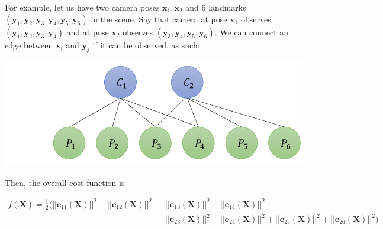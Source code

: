 \documentclass{article}
\theoremstyle{definition}
\theoremstyle{remark}
\theoremstyle{definition}
\begin{document}
For example, let us have two camera poses $\mathbf{x}_1, \mathbf{x}_2$ and 6 landmarks $(\mathbf{y}_1, \mathbf{y}_2, \mathbf{y}_3, \mathbf{y}_4, \mathbf{y}_5, \mathbf{y}_6)$ in the scene. Say that camera at pose $\mathbf{x}_1$ observes $(\mathbf{y}_1, \mathbf{y}_2, \mathbf{y}_3, \mathbf{y}_4)$ and at pose $\mathbf{x}_2$ observes $(\mathbf{y}_3, \mathbf{y}_4, \mathbf{y}_5, \mathbf{y}_6)$. We can connect an edge between $\mathbf{x}_i$ and $\mathbf{y}_j$ if it can be observed, as such: 

\begin{center}
  \includegraphics[scale=0.32]{img/node_graph.png}
\end{center}

Then, the overall cost function is  

\begin{align*}
  f(\mathbf{X}) = \frac{1}{2} \Big( ||\mathbf{e}_{11}(\mathbf{X})||^2 + ||\mathbf{e}_{12}(\mathbf{X})||^2 & + ||\mathbf{e}_{13}(\mathbf{X})||^2 + ||\mathbf{e}_{14}(\mathbf{X})||^2 \\ 
  & + ||\mathbf{e}_{23}(\mathbf{X})||^2 + ||\mathbf{e}_{24}(\mathbf{X})||^2 + ||\mathbf{e}_{25}(\mathbf{X})||^2 + ||\mathbf{e}_{26}(\mathbf{X})||^2 \Big)
\end{align*}
\end{document}
